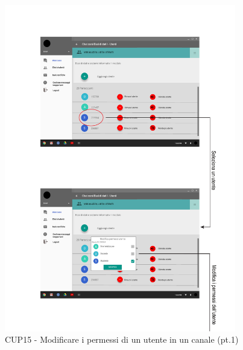 \begin{figure}
	\centering
	\includegraphics[width=0.9\textwidth]{imgs/gruppo6/activities/act_cup15_modifica_permessi_utente1.pdf}
	\caption{CUP15 - Modificare i permessi di un utente in un canale (pt.1)}
	\label{fig:act-cup15-1}
\end{figure}

